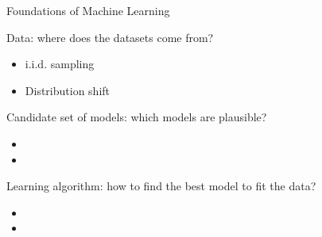 \documentclass[aspectratio=169,12pt]{beamer}
\begin{document}
\begin{frame}[t]{Foundations of Machine Learning}
	
	
	
	\begin{itemize}
		\vspace{0.5cm}
		{\large
			\setlength{\itemsep}{0.5cm}
			\item Data: where does the datasets come from? 
			\vspace{0.2cm}
			\begin{itemize}
				\item i.i.d. sampling
				\item Distribution shift
			\end{itemize}
			\item Candidate set of models: which models are plausible?
			\vspace{0.2cm}
			\begin{itemize}
				\item[] 
				\item[] 
			\end{itemize}
			\item Learning algorithm: how to find the best model to fit the data?
			\vspace{0.2cm}
			\begin{itemize}
				\item[] 
				\item[] 
			\end{itemize}
		}
	\end{itemize}
	
	
\end{frame}
\end{document}
